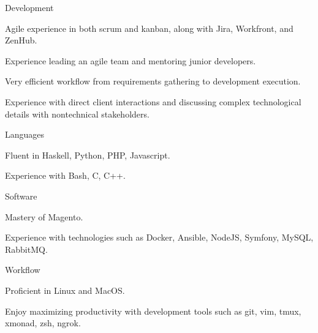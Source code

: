 \begin{cvskills}
  \cvskill
    {Development}
    {
      \begin{cvitems}
        \item Agile experience in both scrum and kanban, along with Jira, Workfront, and ZenHub.
        \item Experience leading an agile team and mentoring junior developers.
        \item Very efficient workflow from requirements gathering to development execution.
        \item Experience with direct client interactions and discussing complex technological details with nontechnical stakeholders.
      \end{cvitems}
    }
  \cvskill
    {Languages}
    {
      \begin{cvitems}
        \item Fluent in Haskell, Python, PHP, Javascript.
        \item Experience with Bash, C, C++.
      \end{cvitems}
    }
  \cvskill
    {Software}
    {
      \begin{cvitems}
        \item Mastery of Magento.
        \item Experience with technologies such as Docker, Ansible, NodeJS, Symfony, MySQL, RabbitMQ.
      \end{cvitems}
    }
  \cvskill
    {Workflow}
    {
      \begin{cvitems}
        \item Proficient in Linux and MacOS.
        \item Enjoy maximizing productivity with development tools such as git, vim, tmux, xmonad, zsh, ngrok.
      \end{cvitems}
    }
\end{cvskills}
